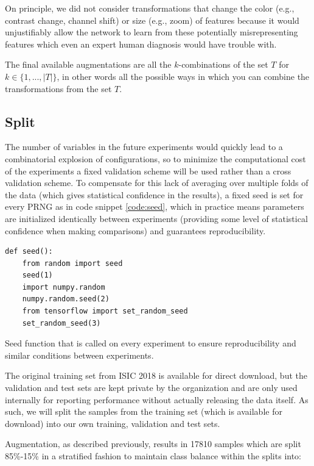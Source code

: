 On principle, we did not consider transformations that change the color (e.g., contrast change, channel shift) or size (e.g., zoom) of features because it would unjustifiably allow the network to learn from these potentially misrepresenting features which even an expert human diagnosis would have trouble with.

The final available augmentations are all the $k$-combinations of the set $T$ for $k \in \{1, ..., |T|\}$, in other words all the possible ways in which you can combine the transformations from the set $T$.

\subsection{Split}

The number of variables in the future experiments would quickly lead to a combinatorial explosion of configurations, so to minimize the computational cost of the experiments a fixed validation scheme will be used rather than a cross validation scheme. To compensate for this lack of averaging over multiple folds of the data (which gives statistical confidence in the results), a fixed seed is set for every \ac{PRNG} as in code snippet \ref{code:seed}, which in practice means parameters are initialized identically between experiments (providing some level of statistical confidence when making comparisons) and guarantees reproducibility.

\begin{listing}[ht]
\begin{verbatim}
def seed():
    from random import seed
    seed(1)
    import numpy.random
    numpy.random.seed(2)
    from tensorflow import set_random_seed
    set_random_seed(3)
\end{verbatim}
\caption{Seed function that is called on every experiment to ensure reproducibility and similar conditions between experiments.}
\label{code:seed}
\end{listing}

The original training set from \ac{ISIC} 2018 is available for direct download, but the validation and test sets are kept private by the organization and are only used internally for reporting performance without actually releasing the data itself. As such, we will split the samples from the training set (which is available for download) into our own training, validation and test sets.

Augmentation, as described previously, results in 17810 samples which are split 85\%-15\% in a stratified fashion to maintain class balance within the splits into:

